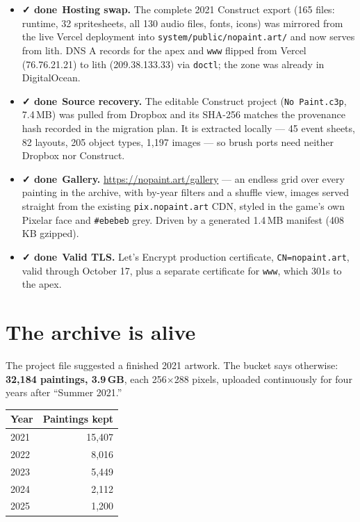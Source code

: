 \documentclass[10pt,letterpaper,twocolumn]{article}
\newcommand{\ok}{{\color{acgreen}\textbf{✓ done}}}
\begin{document}
\begin{itemize}
  \item \ok\ \textbf{Hosting swap.} The complete 2021 Construct export
    (165 files: runtime, 32 spritesheets, all 130 audio files, fonts,
    icons) was mirrored from the live Vercel deployment into
    \texttt{system/public/nopaint.art/} and now serves from lith. DNS
    A records for the apex and \texttt{www} flipped from Vercel
    (76.76.21.21) to lith (209.38.133.33) via \texttt{doctl}; the zone
    was already in DigitalOcean.
  \item \ok\ \textbf{Source recovery.} The editable Construct project
    (\texttt{No Paint.c3p}, 7.4\,MB) was pulled from Dropbox and its
    SHA-256 matches the provenance hash recorded in the migration
    plan. It is extracted locally --- 45 event sheets, 82 layouts,
    205 object types, 1{,}197 images --- so brush ports need neither
    Dropbox nor Construct.
  \item \ok\ \textbf{Gallery.} \url{https://nopaint.art/gallery} ---
    an endless grid over every painting in the archive, with by-year
    filters and a shuffle view, images served straight from the
    existing \texttt{pix.nopaint.art} CDN, styled in the game's own
    Pixelar face and \texttt{\#ebebeb} grey. Driven by a generated
    1.4\,MB manifest (408\,KB gzipped).
  \item \ok\ \textbf{Valid TLS.} Let's Encrypt production certificate,
    \texttt{CN=nopaint.art}, valid through October 17, plus a separate
    certificate for \texttt{www}, which 301s to the apex.
\end{itemize}

\section{The archive is alive}

The project file suggested a finished 2021 artwork. The bucket says
otherwise: \textbf{32{,}184 paintings, 3.9\,GB}, each 256$\times$288
pixels, uploaded continuously for four years after ``Summer 2021.''

\begin{center}
\begin{tabular}{lr}
\toprule
\textbf{Year} & \textbf{Paintings kept} \\
\midrule
2021 & 15{,}407 \\
2022 & 8{,}016 \\
2023 & 5{,}449 \\
2024 & 2{,}112 \\
2025 & 1{,}200 \\
\bottomrule
\end{tabular}
\end{center}
\end{document}
